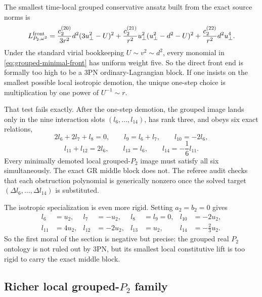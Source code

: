 \documentclass[11pt]{article}
\begin{document}
The smallest time-local grouped conservative ansatz built from the exact source
norms is
\begin{equation}
L_{P_2,\omega^2}^{\rm front}
=
\frac{c_2^{(20)}}{3r^2}d^2(3u_\perp^2-U)^2
+
\frac{c_2^{(21)}}{r^2}u_\perp^2(u_\perp^2-d^2-U)^2
+
\frac{c_2^{(22)}}{r^2}d^2u_\perp^4.
\label{eq:grouped-minimal-front}
\end{equation}
Under the standard virial bookkeeping
\(U\sim v^2\sim d^2\), every monomial in
\eqref{eq:grouped-minimal-front} has uniform weight five.  So the direct front
end is formally too high to be a $3$PN ordinary-Lagrangian block.  If one insists
on the smallest possible local isotropic demotion, the unique one-step choice is
multiplication by one power of
\(U^{-1}\sim r\).

That test fails exactly.  After the one-step demotion, the grouped image lands
only in the nine interaction slots \((l_6,\dots,l_{14})\), has rank three, and
obeys six exact relations,
\begin{equation}
2l_6+2l_7+l_8=0,
\qquad
l_9=l_6+l_7,
\qquad
l_{10}=-2l_6,
\label{eq:grouped-six-rel-1}
\end{equation}
\begin{equation}
l_{11}+l_{12}=2l_6,
\qquad
l_{13}=l_6,
\qquad
l_{14}=-\frac16 l_{11}.
\label{eq:grouped-six-rel-2}
\end{equation}
Every minimally demoted local grouped-$P_2$ image must satisfy all six
simultaneously.  The exact GR middle block does not.  The referee audit checks
that each obstruction polynomial is generically nonzero once the solved target
\((\Delta l_6,\dots,\Delta l_{14})\) is substituted.

The isotropic specialization is even more rigid.  Setting
\(a_2=b_2=0\) gives
\begin{equation}
\begin{aligned}
l_6&=u_2,
& l_7&=-u_2,
& l_8&=l_9=0,
& l_{10}&=-2u_2,
\\
 l_{11}&=4u_2,
& l_{12}&=-2u_2,
& l_{13}&=u_2,
& l_{14}&=-\frac23u_2.
\end{aligned}
\label{eq:grouped-isotropic-minimal-image}
\end{equation}
So the first moral of the section is negative but precise: the grouped real
$P_2$ ontology is not ruled out by $3$PN, but its smallest local constitutive
lift is too rigid to carry the exact middle block.

\subsection{Richer local grouped-\texorpdfstring{$P_2$}{P 2} family}
\label{sec:grouped-richer-family}
\end{document}

